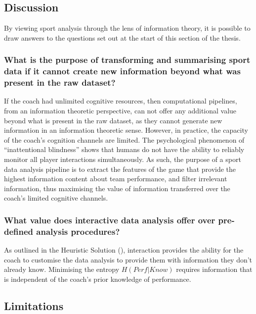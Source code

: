 \subsection{Discussion}\label{sec:infotheory-discussion}

By viewing sport analysis through the lens of information theory, it is possible to draw answers to the questions set out at the start of this section of the thesis.

\subsubsection{What is the purpose of transforming
and summarising sport data if it cannot create new information beyond
what was present in the raw
dataset?}

If the coach had unlimited cognitive resources, then computational pipelines, from an information theoretic perspective, can not offer any
additional value beyond what is present in the raw dataset, as they
cannot generate new information in an information theoretic sense.
However, in practice, the capacity of the coach's cognition channels are
limited. The psychological phenomenon of ``inattentional
blindness'' \cite{Simons1999} shows that humans do not have the ability to
reliably monitor all player interactions simultaneously. As such, the
purpose of a sport data analysis pipeline is to extract the features of the game
that provide the highest information content about team performance, and
filter irrelevant information, thus maximising the value of information
transferred over the coach's limited cognitive channels.

\subsubsection{What value does interactive data
analysis offer over pre-defined analysis
procedures?}

As outlined in the Heuristic Solution (), interaction provides the ability
for the coach to customise the data analysis to
provide them with information they don't already know. Minimising the
entropy $H(Perf|Know)$ requires information that is independent of the
coach's prior knowledge of performance.

\subsection{Limitations}\label{limitations}

